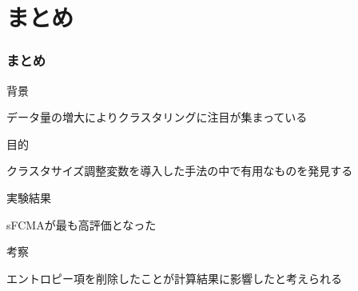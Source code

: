 \documentclass[13pt,dvipdfmx]{beamer}
\begin{document}
\section{まとめ}
\begin{frame}\frametitle{まとめ}
  \begin{block}{背景}
   \begin{center}
    データ量の増大によりクラスタリングに注目が集まっている
   \end{center}
  \end{block}
 \begin{block}{目的}
  \begin{center}
   クラスタサイズ調整変数を導入した手法の中で有用なものを発見する
  \end{center}
 \end{block}
  \begin{block}{実験結果}
   \begin{center}
    sFCMAが最も高評価となった
   \end{center}
  \end{block}
 \begin{block}{考察}
  \begin{center}
   エントロピー項を削除したことが計算結果に影響したと考えられる
  \end{center}
 \end{block}
\end{frame}
\end{document}
